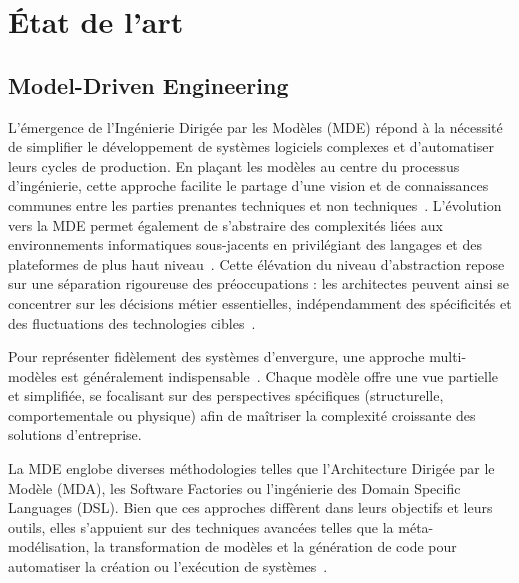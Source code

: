 \chapter{État de l'art}
\label{chap:etat_art}

\section{Model-Driven Engineering}
\label{sec:mde}

L'émergence de l'Ingénierie Dirigée par les Modèles (MDE) répond à la nécessité de simplifier le développement de systèmes logiciels complexes et d'automatiser leurs cycles de production. En plaçant les modèles au centre du processus d'ingénierie, cette approche facilite le partage d'une vision et de connaissances communes entre les parties prenantes techniques et non techniques~\cite{da2015model}. L'évolution vers la MDE permet également de s'abstraire des complexités liées aux environnements informatiques sous-jacents en privilégiant des langages et des plateformes de plus haut niveau~\cite{schmidt2006model}. Cette élévation du niveau d'abstraction repose sur une séparation rigoureuse des préoccupations : les architectes peuvent ainsi se concentrer sur les décisions métier essentielles, indépendamment des spécificités et des fluctuations des technologies cibles~\cite{brown2004model}.

Pour représenter fidèlement des systèmes d'envergure, une approche multi-modèles est généralement indispensable~\cite{brown2004model,da2015model}. Chaque modèle offre une vue partielle et simplifiée, se focalisant sur des perspectives spécifiques (structurelle, comportementale ou physique) afin de maîtriser la complexité croissante des solutions d'entreprise.

La MDE englobe diverses méthodologies telles que l'Architecture Dirigée par le Modèle (MDA), les Software Factories ou l'ingénierie des Domain Specific Languages (DSL). Bien que ces approches diffèrent dans leurs objectifs et leurs outils, elles s'appuient sur des techniques avancées telles que la méta-modélisation, la transformation de modèles et la génération de code pour automatiser la création ou l'exécution de systèmes~\cite{da2015model}.


